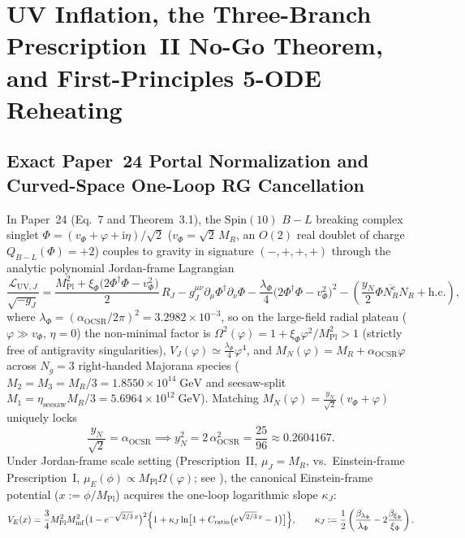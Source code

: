 \documentclass[11pt,a4paper]{article}
\begin{document}
\section{UV Inflation, the Three-Branch Prescription~II No-Go Theorem, and First-Principles 5-ODE Reheating}
\label{sec:uv-inflation}

\subsection{Exact Paper~24 Portal Normalization and Curved-Space One-Loop RG Cancellation}
In Paper~24 \cite{Olcsak2026Paper24} (Eq.~7 and Theorem~3.1), the $\mathrm{Spin}(10)$ $B-L$ breaking complex singlet $\Phi = (v_\Phi + \varphi + \mathrm{i}\eta)/\sqrt{2}$ ($v_\Phi = \sqrt{2}\,M_R$, an $O(2)$ real doublet of charge $Q_{B-L}(\Phi) = +2$) couples to gravity in signature $(-,+,+,+)$ through the analytic polynomial Jordan-frame Lagrangian
\begin{equation}
  \frac{\mathcal{L}_{\mathrm{UV},J}}{\sqrt{-g_J}} = \frac{M_{\mathrm{Pl}}^2 + \xi_\Phi\bigl(2\Phi^\dagger\Phi - v_\Phi^2\bigr)}{2}\,R_J - g_J^{\mu\nu}\partial_\mu\Phi^\dagger\partial_\nu\Phi - \frac{\lambda_\Phi}{4}\bigl(2\Phi^\dagger\Phi - v_\Phi^2\bigr)^2 - \left(\frac{y_N}{2}\Phi\overline{N_R^c}N_R + \mathrm{h.c.}\right),
  \label{eq:paper24-lagrangian}
\end{equation}
where $\lambda_\Phi = (\alpha_{\mathrm{OCSR}}/2\pi)^2 = 3.2982\times 10^{-3}$, so on the large-field radial plateau ($\varphi \gg v_\Phi$, $\eta = 0$) the non-minimal factor is $\Omega^2(\varphi) = 1 + \xi_\Phi\varphi^2/M_{\mathrm{Pl}}^2 > 1$ (strictly free of antigravity singularities), $V_J(\varphi) \simeq \frac{\lambda_\Phi}{4}\varphi^4$, and $M_N(\varphi) = M_R + \alpha_{\mathrm{OCSR}}\varphi$ across $N_g = 3$ right-handed Majorana species ($M_2 = M_3 = M_R/3 = 1.8550\times 10^{14}\;\mathrm{GeV}$ and seesaw-split $M_1 = \eta_{\mathrm{seesaw}}M_R/3 = 5.6964\times 10^{12}\;\mathrm{GeV}$). Matching $M_N(\varphi) = \frac{y_N}{\sqrt{2}}(v_\Phi + \varphi)$ uniquely locks
\begin{equation}
  \frac{y_N}{\sqrt{2}} = \alpha_{\mathrm{OCSR}} \implies y_N^2 = 2\,\alpha_{\mathrm{OCSR}}^2 = \frac{25}{96} \approx 0.2604167.
  \label{eq:exact-yukawa-norm}
\end{equation}
Under Jordan-frame scale setting (Prescription~II, $\mu_J = M_R$, vs.\ Einstein-frame Prescription~I, $\mu_E(\phi) \propto M_{\mathrm{Pl}}\Omega(\varphi)$; see \cite{BezrukovShaposhnikov2008,DeSimone2009}), the canonical Einstein-frame potential ($x := \phi/M_{\mathrm{Pl}}$) acquires the one-loop logarithmic slope $\kappa_J$:
\begin{equation}
  V_E(x) = \frac{3}{4}M_{\mathrm{Pl}}^2 M_{\mathrm{inf}}^2\bigl(1 - e^{-\sqrt{2/3}\,x}\bigr)^2\Bigl\{1 + \kappa_J\ln\bigl[1 + C_{\mathrm{ratio}}\bigl(e^{\sqrt{2/3}\,x} - 1\bigr)\bigr]\Bigr\}, \qquad
  \kappa_J := \frac{1}{2}\left(\frac{\beta_{\lambda_\Phi}}{\lambda_\Phi} - 2\frac{\beta_{\xi_\Phi}}{\xi_\Phi}\right).
  \label{eq:ve-presc-ii}
\end{equation}
\end{document}
